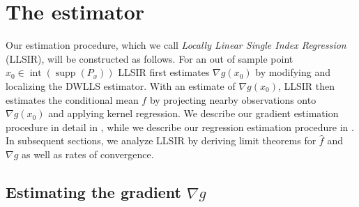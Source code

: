 \documentclass[11pt]{article}
\begin{document}
\section{The estimator}

Our estimation procedure, which we call \emph{Locally Linear Single Index Regression} (LLSIR), will be constructed as follows. For an out of sample point $x_0 \in \operatorname{int}(\operatorname{supp}(P_x))$ LLSIR first estimates $\nabla g(x_0)$ by modifying and localizing the DWLLS estimator. With an estimate of $\nabla g(x_0)$, LLSIR then estimates the conditional mean $f$ by projecting nearby observations onto $\nabla g(x_0)$ and applying kernel regression. We describe our gradient estimation procedure in detail in , while we describe our regression estimation procedure in . In subsequent sections, we analyze LLSIR by deriving limit theorems for $\hat f$ and $\nabla g$ as well as rates of convergence. 

\subsection{Estimating the gradient $\nabla g$} \label{sec: gradient estimation}
\end{document}
